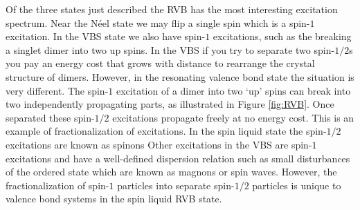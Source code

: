 \documentclass[aps,pra,preprint,groupedaddress]{revtex4-1}
\newcommand{\1}{\mathds{1}}
\begin{document}
 


Of the three states just described the RVB has the most interesting excitation spectrum. Near the N\'eel state we may flip a single spin which is a spin-$1$ excitation. In the VBS state we also have spin-$1$ excitations, such as the breaking a singlet dimer into two up spins. In the VBS if you try to separate two spin-$1/2$s you pay an energy cost that grows with distance to rearrange the crystal structure of dimers. However, in the resonating valence bond state the situation is very different. The spin-$1$ excitation of a dimer into two `up' spins can break into two independently propagating parts, as illustrated in Figure \ref{fig:RVB}. Once separated these spin-$1/2$ excitations propagate freely at no energy cost. This is an example of fractionalization of excitations. In the spin liquid state the spin-$1/2$ excitations are known as spinons%
Other excitations in the VBS are spin-$1$ excitations and have a well-defined dispersion relation such as small disturbances of the ordered state which are known as magnons or spin waves. However, the fractionalization of spin-$1$ particles into separate spin-$1/2$ particles is unique to valence bond systems in the spin liquid RVB state.

\end{document}

